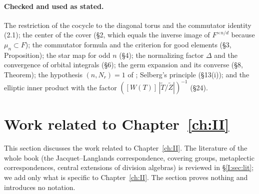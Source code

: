 \paragraph{Checked and used as stated.} The restriction of the cocycle to the diagonal torus and the commutator identity (2.1); the center of the cover (\S2, which equals the inverse image of $F^{\times n/d}$ because $\mu_n\subset F$); the commutator formula and the criterion for good elements (\S3, Proposition); the star map for odd $n$ (\S4); the normalizing factor $\Delta$ and the convergence of orbital integrals (\S6); the germ expansion and its converse (\S8, Theorem); the hypothesis $(n,N_r)=1$ of \cite[\S12, Corollary]{FK86}; Selberg's principle (\S13(i)); and the elliptic inner product with the factor $([W(T)]\,|\widetilde T/\widetilde Z|)^{-1}$ (\S24).

\section{Work related to \texorpdfstring{Chapter~\ref{ch:II}}{Chapter 5}}\label{II:sec:lit}
This section discusses the work related to Chapter~\ref{ch:II}. The literature of the whole book (the Jacquet--Langlands correspondence, covering groups, metaplectic correspondences, central extensions of division algebras) is reviewed in \S\ref{I:sec:lit}; we add only what is specific to Chapter~\ref{ch:II}. The section proves nothing and introduces no notation.

